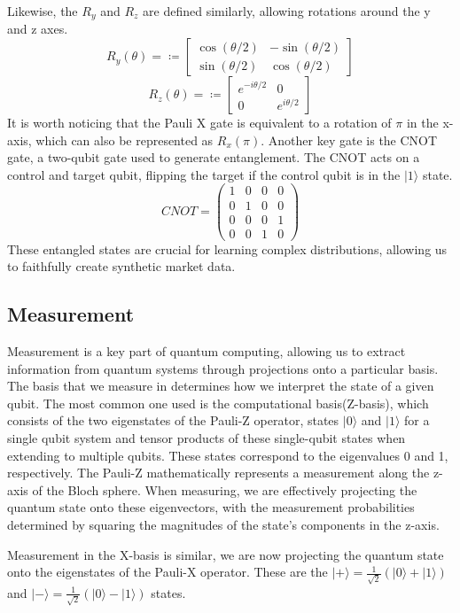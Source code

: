 \documentclass[12pt]{article}
\newcommand{\newp}
    {
    \vskip 0.5cm 
  }
\numberwithin{equation}{section}
\begin{document}
Likewise, the $R_y$ and $R_z$ are defined similarly, allowing rotations around the 
y and z axes.
$$
R_y(\theta) = \coloneqq 
\begin{bmatrix}
\cos(\theta/2) & -\sin(\theta/2) \\
\sin(\theta/2) & \cos(\theta/2)
\end{bmatrix}
$$
$$
R_z(\theta) = \coloneqq 
\begin{bmatrix}
e^{-i\theta/2} & 0 \\
0 & e^{i\theta/2}
\end{bmatrix}
$$
It is worth noticing that the Pauli X gate is equivalent to a rotation of $\pi$ in the 
x-axis, which can also be represented as $R_x(\pi)$. 
Another key gate is the CNOT gate, a two-qubit gate used to generate entanglement. 
The CNOT acts on a control and target qubit, flipping the target if the control 
qubit is in the $|1\rangle$ state. 
$$
CNOT =
\begin{pmatrix}
1 & 0 & 0 & 0 \\
0 & 1 & 0 & 0 \\
0 & 0 & 0 & 1 \\
0 & 0 & 1 & 0
\end{pmatrix}
$$
These entangled states are crucial for learning complex distributions, allowing us 
to faithfully create synthetic market data. 
\subsection{Measurement}
Measurement is a key part of quantum computing, allowing us to extract information 
from quantum systems through projections onto a particular basis. The basis that 
we measure in determines how we interpret the state of a given qubit. The most common 
one used is the computational basis(Z-basis), which consists of the 
two eigenstates of the Pauli-Z operator, states $|0\rangle$ and $|1\rangle$ 
for a single qubit system and tensor products of these single-qubit states when 
extending to multiple qubits. These states correspond to the eigenvalues 0 and 1, 
respectively. The Pauli-Z mathematically represents a measurement along the z-axis
of the Bloch sphere. When measuring, we are effectively projecting the quantum 
state onto these eigenvectors, with the measurement probabilities determined 
by squaring the magnitudes of the state's components in the z-axis.
\newp 
Measurement in the X-basis is similar, we are now projecting the quantum state onto 
the eigenstates of the Pauli-X operator. These are the 
$|+\rangle = \frac{1}{\sqrt{2}}(|0\rangle+|1\rangle)$ and 
$|-\rangle = \frac{1}{\sqrt{2}}(|0\rangle-|1\rangle)$ states. 
\end{document}
